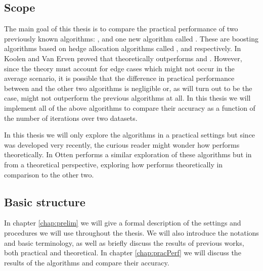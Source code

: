 \subsection{Scope}

The main goal of this thesis is to compare the practical performance of two previously known algorithms: \adaB, \NHB and one new algorithm called \squintB. These are boosting algorithms based on hedge allocation algorithms called \hedge, \adaN and \squint respectively. In \cite{Koolen2015} Koolen and Van Erven proved that \squint theoretically outperforms \hedge and \adaN. However, since the theory must account for edge cases which might not occur in the average scenario, it is possible that the difference in practical performance between \squint and the other two algorithms is negligible or, as will turn out to be the case, \squintB might not outperform the previous algorithms at all. In this thesis we will implement all of the above algorithms to compare their accuracy as a function of the number of iterations over two datasets.

\par In this thesis we will only explore the algorithms in a practical settings but since \squint was developed very recently, the curious reader might wonder how \squintB performs theoretically. In \cite{Otten2016} Otten performs a similar exploration of these algorithms but in from a theoretical perspective, exploring how \squintB performs theoretically in comparison to the other two. 

\subsection{Basic structure}
In chapter \ref{chap:prelim} we will give a formal description of the settings and procedures we will use throughout the thesis. We will also introduce the notations and basic terminology, as well as briefly discuss the results of previous works, both practical and theoretical. In chapter \ref{chap:pracPerf} we will discuss the results of the algorithms and compare their accuracy.